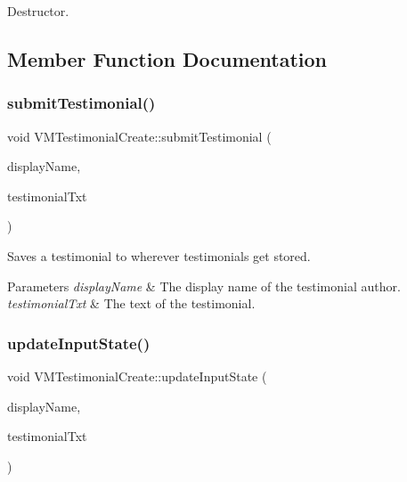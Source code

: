 Destructor. 



\subsection{Member Function Documentation}
\mbox{\label{class_v_m_testimonial_create_add444a0cb13f978e1cef24b45283bf92}} 
\subsubsection{\texorpdfstring{submitTestimonial()}{submitTestimonial()}}
{\footnotesize\ttfamily void V\+M\+Testimonial\+Create\+::submit\+Testimonial (\begin{DoxyParamCaption}\item[{const Q\+String}]{display\+Name,  }\item[{const Q\+String}]{testimonial\+Txt }\end{DoxyParamCaption})}



Saves a testimonial to wherever testimonials get stored. 


\begin{DoxyParams}{Parameters}
{\em display\+Name} & The display name of the testimonial author. \\
\hline
{\em testimonial\+Txt} & The text of the testimonial. \\
\hline
\end{DoxyParams}
\mbox{\label{class_v_m_testimonial_create_a9f9c3ff96e890ff6a5e3b9d05824df27}} 
\subsubsection{\texorpdfstring{updateInputState()}{updateInputState()}}
{\footnotesize\ttfamily void V\+M\+Testimonial\+Create\+::update\+Input\+State (\begin{DoxyParamCaption}\item[{const Q\+String}]{display\+Name,  }\item[{const Q\+String}]{testimonial\+Txt }\end{DoxyParamCaption})}



